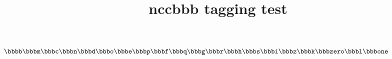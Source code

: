 \documentclass{article}
\title{nccbbb tagging test}
\begin{document}
$\bbbb\bbbm
\bbbc \bbbn
\bbbd \bbbo
\bbbe \bbbp
\bbbf \bbbq
\bbbg \bbbr
\bbbh \bbbs
\bbbi \bbbz
\bbbk \bbbzero
\bbbl \bbbone$
\end{document}
